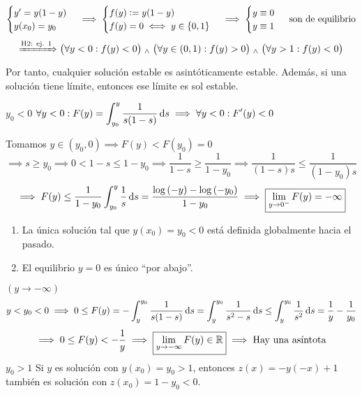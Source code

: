 \begin{ejem}
	\[\begin{cases}
			y'=y(1-y) \\
			y(x_0)=y_0
		\end{cases} \implies \begin{cases}
			f(y)\vcentcolon= y(1-y) \\
			f(y) = 0 \iff y \in \{0, 1\}
		\end{cases} \implies \begin{cases}
			y \equiv 0 \\
			y \equiv 1 \\
		\end{cases}\text{ son de equilibrio}\]
	\[\xRightarrow{\text{H2: ej. 1}} \big(\forall y < 0 :f(y) < 0\big) \; _{\wedge} \; \big(\forall y \in (0, 1) : f(y) > 0\big) \; _{\wedge} \; \big(\forall y > 1 : f(y) < 0\big)\]
	Por tanto, cualquier solución estable es asintóticamente estable. Además, si una solución tiene límite, entonces ese límite es sol estable.

	$\boxed{y_0 < 0}$ \hspace{1cm}$\ds \forall y < 0 : F(y)=\int_{y_0}^{y}\frac{1}{s(1-s)}\odif{s} \implies \forall y<0 : F'(y)<0$

	Tomamos $y\in (y_0, 0) \implies F(y)<F(y_0)=0$
	\[\implies s \geq y_0 \implies 0<1-s \leq 1-y_0 \implies \frac{1}{1-s}\geq\frac{1}{1-y_0} \implies \frac{1}{(1-s)s}\leq \frac{1}{(1-y_0)s}\]
	\[\implies F(y) \leq \frac{1}{1-y_0}\int_{y_0}^{y} \frac{1}{s} \odif{s} = \frac{\log{(-y)} - \log{(-y_0)}}{1-y_0} \implies \boxed{\lim_{y\to0^-} F(y) = -\infty}\]
	\begin{enumerate}
		\item La única solución tal que $y(x_0)=y_0<0$ está definida globalmente hacia el pasado.
		\item El equilibrio $y=0$ es único ``por abajo''.
	\end{enumerate}
	$(y\to-\infty)$
	\[y<y_0<0 \implies 0 \leq F(y)=-\int_{y}^{y_0} \frac{1}{s(1-s)} \odif{s} = \int_{y}^{y_0} \frac{1}{s^2-s} \odif{s} \leq \int_{y}^{y_0} \frac{1}{s^2} \odif{s} = \frac{1}{y} -\frac{1}{y_0}\]
	\[\implies 0\leq F(y) < -\frac{1}{y} \implies \boxed{\lim_{y\to -\infty} F(y) \in \mathbb{R}} \implies \text{Hay una asíntota}\]
	$\boxed{y_0>1}$ Si $y$ es solución con $y(x_0)=y_0>1$, entonces $z(x)=-y(-x)+1$ también es solución con $z(x_0)=1-y_0<0$.
\end{ejem}

